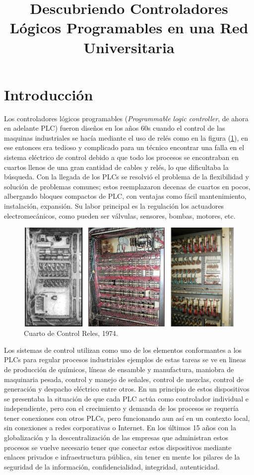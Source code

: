 \documentclass[jou]{apa6}   %
\title{Descubriendo Controladores Lógicos Programables en una Red Universitaria}
\begin{document}
\maketitle    
                     
\section{Introducción}
Los controladores lógicos programables (\textit{Programmable logic controller}, de ahora en adelante PLC) fueron diseños en los años 60s \cite{Vanessa}
cuando el control de las maquinas industriales se hacía mediante el uso de relés como en la figura (\ref{fig:cuartoreles}), en ese entonces era tedioso
y complicado para un técnico encontrar una falla en el sistema eléctrico de control debido a que todo los procesos se encontraban en cuartos llenos de  
una gran cantidad de cables y relés, lo que dificultaba la búsqueda. Con la llegada de los  PLCs se resolvió el problema de la flexibilidad y solución 
de problemas comunes; estos reemplazaron decenas de cuartos en pocos, albergando bloques compactos de PLC, con ventajas como fácil mantenimiento,
instalación, expansión. Su labor principal es la regulación  los actuadores electromecánicos, como pueden ser válvulas, sensores, bombas, motores, etc.\\
\begin{figure}[htb]
\centering
\includegraphics[scale=0.28]{images/relayroom.png}
\caption{Cuarto de Control Reles, 1974.} \label{fig:cuartoreles}
\end{figure}

Los sistemas de control utilizan como uno de los elementos conformantes  a los PLCs  para regular procesos industriales  ejemplos de estas tareas se ve
en lineas de producción de químicos, líneas de ensamble y manufactura, maniobra de maquinaria pesada,  control y manejo de señales, control de mezclas, 
control de generación y despacho eléctrico entre otros. En un principio de estos dispositivos se presentaba la situación de que 
cada PLC actúa como controlador individual e independiente, pero con el crecimiento y demanda de los procesos se requería tener conexiones con otros 
PLCs, pero funcionando aun así en un contexto local, sin conexiones a redes corporativas o Internet\cite{Protecting}. 
En los últimos 15 años con la globalización y la descentralización de las empresas que administran estos procesos se vuelve necesario tener que 
conectar estos dispositivos mediante enlaces privados e infraestructura pública, sin tener en mente los pilares de la seguridad de la información, confidencialidad, integridad, autenticidad.\\
\end{document}
